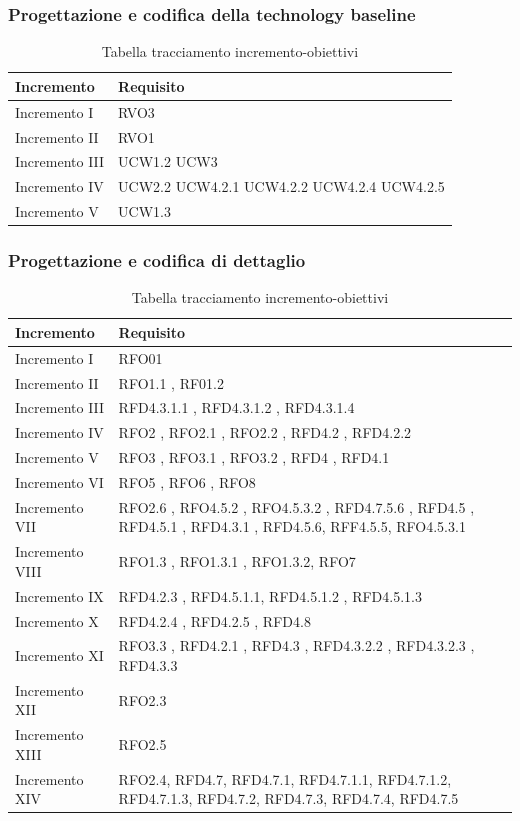 \documentclass[../piano_di_progetto.tex]{subfiles}
\begin{document}
\subsubsection*{Progettazione e codifica della technology baseline}
\begin{table}[!ht]
	\centering
	\begin{tabular}{|p{3cm}|p{6.5cm}|}
	\hline
	\rowcolor{lightgray}
    \textbf{Incremento} & \textbf{Requisito}\\
    \hline
        Incremento I & RVO3\\
        Incremento II & RVO1\\
        Incremento III & UCW1.2  UCW3 \\
        Incremento IV & UCW2.2 UCW4.2.1 UCW4.2.2 UCW4.2.4 UCW4.2.5\\
        Incremento V & UCW1.3\\
    \hline
    \end{tabular}
    \caption{Tabella tracciamento incremento-obiettivi}
\end{table}

\subsubsection*{Progettazione e codifica di dettaglio}
\begin{table}[!ht]
	\centering
	\begin{tabular}{|p{3cm}|p{6.5cm}|}
	\hline
	\rowcolor{lightgray}
    \textbf{Incremento} & \textbf{Requisito}\\
    \hline
        Incremento I & RFO01 \\
        Incremento II & RFO1.1 , RF01.2 \\
        Incremento III & RFD4.3.1.1 , RFD4.3.1.2 , RFD4.3.1.4 \\
        Incremento IV & RFO2 , RFO2.1 , RFO2.2 , RFD4.2 , RFD4.2.2 \\
        Incremento V & RFO3 , RFO3.1 , RFO3.2 , RFD4 , RFD4.1 \\	
        Incremento VI &  RFO5 , RFO6 , RFO8 \\
        Incremento VII & RFO2.6 , RFO4.5.2 , RFO4.5.3.2 , RFD4.7.5.6 , RFD4.5 , RFD4.5.1 , RFD4.3.1 , RFD4.5.6, RFF4.5.5, RFO4.5.3.1 \\
        Incremento VIII & RFO1.3 , RFO1.3.1 , RFO1.3.2, RFO7 \\
        Incremento IX & RFD4.2.3 , RFD4.5.1.1, RFD4.5.1.2 , RFD4.5.1.3 \\
        Incremento X & RFD4.2.4 , RFD4.2.5 , RFD4.8 \\
        Incremento XI & RFO3.3 , RFD4.2.1  , RFD4.3  , RFD4.3.2.2 , RFD4.3.2.3 , RFD4.3.3 \\
        Incremento XII & RFO2.3 \\
        Incremento XIII & RFO2.5 \\
        Incremento XIV & RFO2.4, RFD4.7, RFD4.7.1, RFD4.7.1.1, RFD4.7.1.2, RFD4.7.1.3, RFD4.7.2, RFD4.7.3, RFD4.7.4, RFD4.7.5 \\        
    \hline	
	\end{tabular}
	\caption{Tabella tracciamento incremento-obiettivi}
\end{table}
\end{document}
